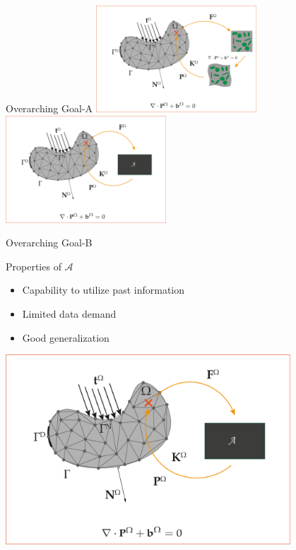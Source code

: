 \begin{frame}{Overarching Goal-A}
\centering
  \includegraphics[width=0.45\textwidth]{Figures/myview/FE2-CONV}\hspace{1cm}\includegraphics[width=0.45\textwidth]{Figures/myview/fe2-ML}
\end{frame}

\begin{frame}{Overarching Goal-B}
\begin{minipage}{0.45\textwidth}
  \begin{block}{\color{White}Properties of $\mathcal{A}$}
  \begin{itemize}
    \item Capability to utilize past information
    \item Limited data demand 
    \item Good generalization 
  \end{itemize}
\end{block}
\end{minipage}%
  \begin{minipage}{0.5\textwidth}
    \centering
    \includegraphics[width=0.8\textwidth]{Figures/myview/fe2-ML}
  \end{minipage}
\end{frame}


